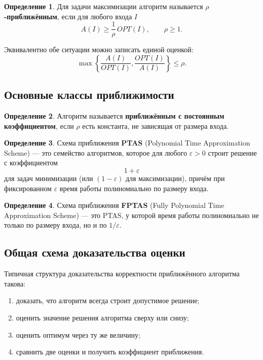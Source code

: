 \documentclass[12pt,a4paper]{article}
\theoremstyle{definition}
\newtheorem{definition}{Определение}[section]
\theoremstyle{plain}
\begin{document}
\begin{definition}
Для задачи максимизации алгоритм называется \textbf{$\rho$-приближённым}, если для любого входа $I$
\[
A(I)\ge \frac{1}{\rho}\,OPT(I), \qquad \rho\ge 1.
\]
\end{definition}

Эквивалентно обе ситуации можно записать единой оценкой:
\[
\max\left\{\frac{A(I)}{OPT(I)},\frac{OPT(I)}{A(I)}\right\}\le \rho.
\]

\subsection{Основные классы приближимости}

\begin{definition}
Алгоритм называется \textbf{приближённым с постоянным коэффициентом}, если $\rho$ есть константа, не зависящая от размера входа.
\end{definition}

\begin{definition}
Схема приближения \textbf{PTAS} (Polynomial Time Approximation Scheme) --- это семейство алгоритмов, которое для любого $\varepsilon>0$ строит решение с коэффициентом
\[
1+\varepsilon
\]
для задач минимизации (или $(1-\varepsilon)$ для максимизации), причём при фиксированном $\varepsilon$ время работы полиномиально по размеру входа.
\end{definition}

\begin{definition}
Схема приближения \textbf{FPTAS} (Fully Polynomial Time Approximation Scheme) --- это PTAS, у которой время работы полиномиально не только по размеру входа, но и по $1/\varepsilon$.
\end{definition}

\subsection{Общая схема доказательства оценки}
Типичная структура доказательства корректности приближённого алгоритма такова:
\begin{enumerate}
\item доказать, что алгоритм всегда строит допустимое решение;
\item оценить значение решения алгоритма сверху или снизу;
\item оценить оптимум через ту же величину;
\item сравнить две оценки и получить коэффициент приближения.
\end{enumerate}
\end{document}
